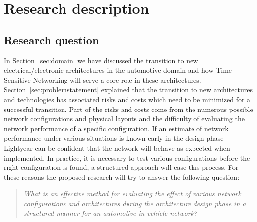\section{Research description}
\label{sec:researchdescription}
\subsection{Research question}
\label{sec:researchquestion}
In Section~\ref{sec:domain} we have discussed the transition to new electrical/electronic architectures in the automotive domain and how Time Sensitive Networking will serve a core role in these architectures. Section~\ref{sec:problemstatement} explained that the transition to new architectures and technologies has associated risks and costs which need to be minimized for a successful transition. Part of the risks and costs come from the numerous possible network configurations and physical layouts and the difficulty of evaluating the network performance of a specific configuration. If an estimate of network performance under various situations is known early in the design phase Lightyear can be confident that the network will behave as expected when implemented. In practice, it is necessary to test various configurations before the right configuration is found, a structured approach will ease this process. For these reasons the proposed research will try to answer the following question:
\begin{quote}
    \emph{What is an effective method for evaluating the effect of various network configurations and architectures during the architecture design phase in a structured manner for an automotive in-vehicle network?}
\end{quote}
